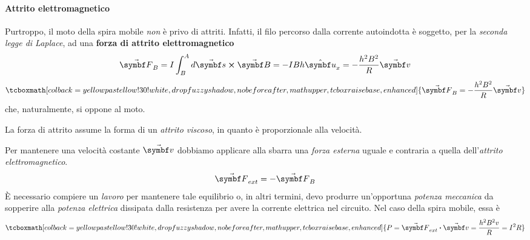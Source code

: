 \paragraph{Attrito elettromagnetico}
Purtroppo, il moto della spira mobile \textit{non} è privo di attriti. Infatti, il filo percorso dalla corrente autoindotta è soggetto, per la \textit{seconda legge di Laplace}, ad una \textbf{forza di attrito elettromagnetico}
\begin{equation*}
	\vba{F}_B=I\int_{B}^{A}d\vba{s}\cross\vba{B}=-IBh\vbh{u}_x=-\frac{h^2B^2}{R}\vba{v}
\end{equation*}
\begin{equation}
	\tcboxmath[colback=yellowpastellow!30!white,drop fuzzy shadow, nobeforeafter, math upper, tcbox raise base, enhanced]{\vba{F}_B=-\frac{h^2B^2}{R}\vba{v}}
\end{equation}
che, naturalmente, si oppone al moto.
\begin{observe}
	La forza di attrito assume la forma di un \textit{attrito viscoso}, in quanto è proporzionale alla velocità.
\end{observe}
Per mantenere una velocità costante $\vba{v}$ dobbiamo applicare alla sbarra una \textit{forza esterna} uguale e contraria a quella dell'\textit{attrito elettromagnetico}.
\begin{equation*}
	\vba{F}_{ext}=-\vba{F}_B
\end{equation*}
È necessario compiere un \textit{lavoro} per mantenere tale equilibrio o, in altri termini, devo produrre un'opportuna \textit{potenza meccanica} da sopperire alla \textit{potenza elettrica} dissipata dalla resistenza per avere la corrente elettrica nel circuito.
Nel caso della spira mobile, essa è
\begin{equation}
	\tcboxmath[colback=yellowpastellow!30!white,drop fuzzy shadow, nobeforeafter, math upper, tcbox raise base, enhanced]{P=\vba{F}_{ext}\vdot \vba{v}=\frac{h^2B^2v}{R}=I^2R}
\end{equation}
